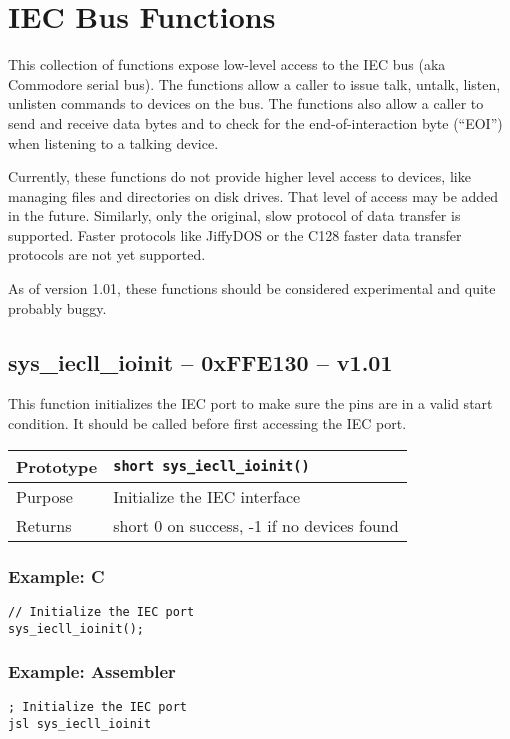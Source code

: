 \section{IEC Bus Functions}
This collection of functions expose low-level access to the IEC bus (aka Commodore serial bus).
The functions allow a caller to issue {\sc talk}, {\sc untalk}, {\sc listen}, {\sc unlisten} commands to devices on the bus.
The functions also allow a caller to send and receive data bytes and to check for the end-of-interaction byte (``EOI'') when
listening to a talking device.

Currently, these functions do not provide higher level access to devices, like managing files and directories on disk drives.
That level of access may be added in the future.
Similarly, only the original, slow protocol of data transfer is supported.
Faster protocols like JiffyDOS or the C128 faster data transfer protocols are not yet supported.

As of version 1.01, these functions should be considered experimental and quite probably buggy.

\subsection*{sys\_iecll\_ioinit -- 0xFFE130 -- v1.01}
This function initializes the IEC port to make sure the pins are in a valid start condition. It should be called before first accessing the IEC port.

\bigskip

\begin{table}[!h]\begin{tabular}{|l||l|} \hline
Prototype & \lstinline!short sys_iecll_ioinit()! \\ \hline
Purpose & Initialize the IEC interface \\ \hline
Returns & short 0 on success, -1 if no devices found \\ \hline
\end{tabular}\end{table}

\subsubsection*{Example: C}
\begin{lstlisting}
// Initialize the IEC port
sys_iecll_ioinit();
\end{lstlisting}

\subsubsection*{Example: Assembler}
\begin{verbatim}
; Initialize the IEC port
jsl sys_iecll_ioinit
\end{verbatim}


